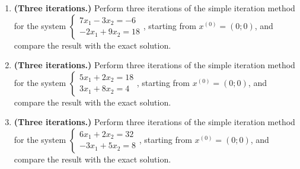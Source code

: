 \begin{enumerate}[label=\arabic*., leftmargin=*]
\item \textbf{(Three iterations.)} Perform three iterations of the simple iteration method for the system $\begin{cases}7x_1-3x_2=-6\\-2x_1+9x_2=18\end{cases}$, starting from $x^{(0)}=(0;0)$, and compare the result with the exact solution.
\item \textbf{(Three iterations.)} Perform three iterations of the simple iteration method for the system $\begin{cases}5x_1+2x_2=18\\3x_1+8x_2=4\end{cases}$, starting from $x^{(0)}=(0;0)$, and compare the result with the exact solution.
\item \textbf{(Three iterations.)} Perform three iterations of the simple iteration method for the system $\begin{cases}6x_1+2x_2=32\\-3x_1+5x_2=8\end{cases}$, starting from $x^{(0)}=(0;0)$, and compare the result with the exact solution.
\end{enumerate}

